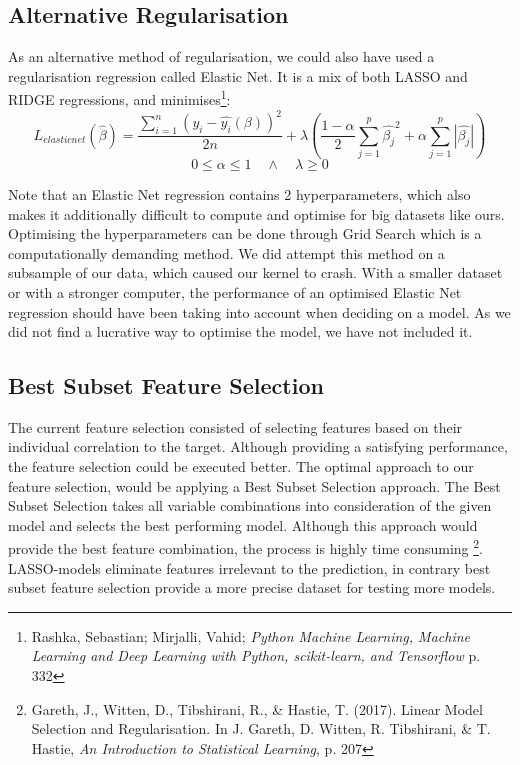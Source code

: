 \documentclass[12pt,a4paper]{article}
\begin{document}
\subsection{Alternative Regularisation}
As an alternative method of regularisation, we could also have used a regularisation regression called Elastic Net. It is a mix of both LASSO and RIDGE regressions, and minimises\footnote{Rashka, Sebastian; Mirjalli, Vahid; \textit{Python Machine Learning, Machine Learning and Deep Learning with Python, scikit-learn, and Tensorflow} p. 332}:
$$L_{elasticnet}(\hat{\beta}) = \frac{\sum_{i=1}^{n}\left(y_i-\hat{y_i}(\beta)\right)^2}{2n} + \lambda\left(\frac{1-\alpha}{2}\sum_{j=1}^{p}\hat{\beta_j}^2+\alpha\sum_{j=1}^{p}|\hat{\beta_j}|\right)$$
$$0 \leq \alpha \leq 1 \quad \wedge \quad \lambda \geq 0$$

Note that an Elastic Net regression contains 2 hyperparameters, which also makes it additionally difficult to compute and optimise for big datasets like ours. Optimising the hyperparameters can be done through Grid Search which is a computationally demanding method. We did attempt this method on a subsample of our data, which caused our kernel to crash. With a smaller dataset or with a stronger computer, the performance of an optimised Elastic Net regression should have been taking into account when deciding on a model. As we did not find a lucrative way to optimise the model, we have not included it. 


\subsection{Best Subset Feature Selection}
The current feature selection consisted of selecting features based on their individual correlation to the target. Although providing a satisfying performance, the feature selection could be executed better. The optimal approach to our feature selection, would be applying a Best Subset Selection approach. The Best Subset Selection takes all variable combinations into consideration of the given model and selects the best performing model. Although this approach would provide the best feature combination, the process is highly time consuming \footnote{Gareth, J., Witten, D., Tibshirani, R., \& Hastie, T. (2017). Linear Model Selection and Regularisation. In J. Gareth, D. Witten, R. Tibshirani, \& T. Hastie, \textit{An Introduction to Statistical Learning}, p. 207}. LASSO-models eliminate features irrelevant to the prediction, in contrary best subset feature selection provide a more precise dataset for testing more models. 
\end{document}
